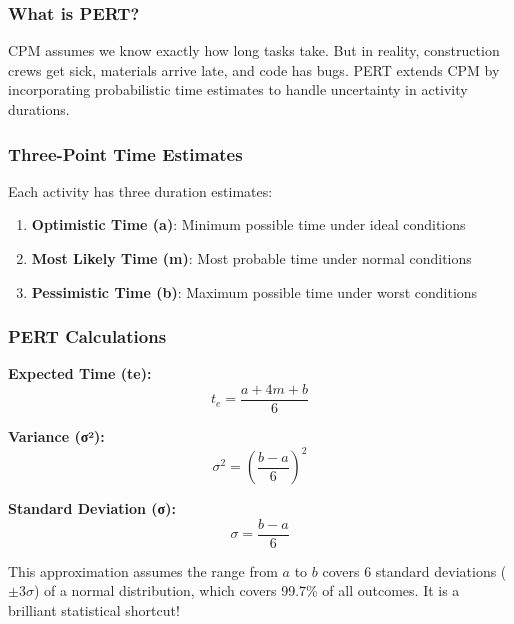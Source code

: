 \documentclass[
  letterpaper,
  DIV=11,
  numbers=noendperiod]{scrreprt}
\providecommand{\tightlist}{%
  \setlength{\itemsep}{0pt}\setlength{\parskip}{0pt}}
\begin{document}
\subsubsection{What is PERT?}\label{what-is-pert}

CPM assumes we know exactly how long tasks take. But in reality,
construction crews get sick, materials arrive late, and code has bugs.
PERT extends CPM by incorporating probabilistic time estimates to handle
uncertainty in activity durations.

\subsubsection{Three-Point Time
Estimates}\label{three-point-time-estimates}

Each activity has three duration estimates:

\begin{enumerate}
\def\labelenumi{\arabic{enumi}.}
\tightlist
\item
  \textbf{Optimistic Time (a)}: Minimum possible time under ideal
  conditions
\item
  \textbf{Most Likely Time (m)}: Most probable time under normal
  conditions
\item
  \textbf{Pessimistic Time (b)}: Maximum possible time under worst
  conditions
\end{enumerate}

\subsubsection{PERT Calculations}\label{pert-calculations}

\textbf{Expected Time (te):} \[
t_e = \frac{a + 4m + b}{6}
\]

\textbf{Variance (σ²):} \[
\sigma^2 = \left(\frac{b - a}{6}\right)^2
\]

\textbf{Standard Deviation (σ):} \[
\sigma = \frac{b - a}{6}
\]

\begin{tcolorbox}[enhanced jigsaw, leftrule=.75mm, rightrule=.15mm, colback=white, colbacktitle=quarto-callout-tip-color!10!white, arc=.35mm, opacityback=0, toptitle=1mm, bottomrule=.15mm, bottomtitle=1mm, titlerule=0mm, title=\textcolor{quarto-callout-tip-color}{\faLightbulb}\hspace{0.5em}{Why divide by 6?}, toprule=.15mm, left=2mm, coltitle=black, breakable, colframe=quarto-callout-tip-color-frame, opacitybacktitle=0.6]

This approximation assumes the range from \(a\) to \(b\) covers 6
standard deviations (\(\pm 3\sigma\)) of a normal distribution, which
covers 99.7\% of all outcomes. It is a brilliant statistical shortcut!

\end{tcolorbox}
\end{document}
